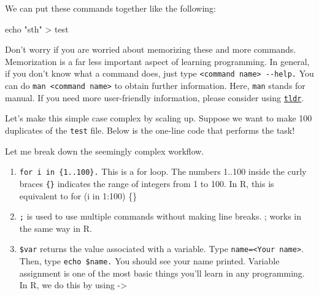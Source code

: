 \documentclass[
  letterpaper,
  DIV=11,
  numbers=noendperiod]{scrreprt}
\newenvironment{Shaded}{\begin{snugshade}}{\end{snugshade}}
\newcommand{\BuiltInTok}[1]{\textcolor[rgb]{0.00,0.23,0.31}{#1}}
\newcommand{\ControlFlowTok}[1]{\textcolor[rgb]{0.00,0.23,0.31}{#1}}
\newcommand{\DataTypeTok}[1]{\textcolor[rgb]{0.68,0.00,0.00}{#1}}
\newcommand{\DecValTok}[1]{\textcolor[rgb]{0.68,0.00,0.00}{#1}}
\newcommand{\FunctionTok}[1]{\textcolor[rgb]{0.28,0.35,0.67}{#1}}
\newcommand{\KeywordTok}[1]{\textcolor[rgb]{0.00,0.23,0.31}{#1}}
\newcommand{\NormalTok}[1]{\textcolor[rgb]{0.00,0.23,0.31}{#1}}
\newcommand{\OperatorTok}[1]{\textcolor[rgb]{0.37,0.37,0.37}{#1}}
\newcommand{\StringTok}[1]{\textcolor[rgb]{0.13,0.47,0.30}{#1}}
\newcommand{\VariableTok}[1]{\textcolor[rgb]{0.07,0.07,0.07}{#1}}
\begin{document}
We can put these commands together like the following:

\begin{Shaded}
\begin{Highlighting}[]
\BuiltInTok{echo} \StringTok{"sth"} \OperatorTok{\textgreater{}}\NormalTok{ test }
\end{Highlighting}
\end{Shaded}

Don't worry if you are worried about memorizing these and more commands.
Memorization is a far less important aspect of learning programming. In
general, if you don't know what a command does, just type
\texttt{\textless{}command\ name\textgreater{}\ -\/-help.} You can do
\texttt{man\ \textless{}command\ name\textgreater{}} to obtain further
information. Here, \texttt{man} stands for manual. If you need more
user-friendly information, please consider using
\href{https://tldr.sh/}{\texttt{tldr}}.

Let's make this simple case complex by scaling up. Suppose we want to
make 100 duplicates of the \texttt{test} file. Below is the one-line
code that performs the task!

\begin{Shaded}
\end{Shaded}

Let me break down the seemingly complex workflow.

\begin{enumerate}
\def\labelenumi{\arabic{enumi}.}
\item
  \texttt{for\ i\ in\ \{1..100\}.} This is a for loop. The numbers
  1..100 inside the curly braces \texttt{\{\}} indicates the range of
  integers from 1 to 100. In R, this is equivalent to for (i in 1:100)
  \{\}\\
\item
  \texttt{;} is used to use multiple commands without making line
  breaks. ; works in the same way in R.
\item
  \texttt{\$var} returns the value associated with a variable. Type
  \texttt{name=\textless{}Your\ name\textgreater{}}. Then, type
  \texttt{echo\ \$name.} You should see your name printed. Variable
  assignment is one of the most basic things you'll learn in any
  programming. In R, we do this by using -\textgreater{}
\end{enumerate}
\end{document}
